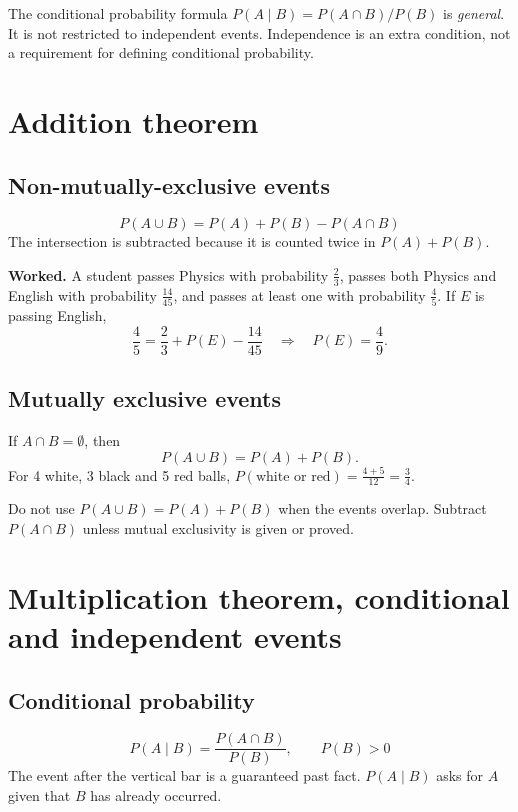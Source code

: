 \documentclass[11pt,a4paper]{article}
\begin{document}
\begin{dangerbox}
The conditional probability formula $P(A\mid B)=P(A\cap B)/P(B)$ is \emph{general}. It is not restricted to independent events. Independence is an extra condition, not a requirement for defining conditional probability.
\end{dangerbox}

\section{Addition theorem}

\subsection{Non-mutually-exclusive events}
\[
\boxed{P(A\cup B)=P(A)+P(B)-P(A\cap B)}
\]
The intersection is subtracted because it is counted twice in $P(A)+P(B)$.

\begin{exambox}
\textbf{Worked.} A student passes Physics with probability $\frac{2}{3}$, passes both Physics and English with probability $\frac{14}{45}$, and passes at least one with probability $\frac{4}{5}$. If $E$ is passing English,
\[
\frac45=\frac23+P(E)-\frac{14}{45}\quad\Longrightarrow\quad P(E)=\frac49.
\]
\end{exambox}

\subsection{Mutually exclusive events}
If $A\cap B=\emptyset$, then
\[
P(A\cup B)=P(A)+P(B).
\]
For 4 white, 3 black and 5 red balls, $P(\text{white or red})=\frac{4+5}{12}=\frac34$.

\begin{dangerbox}
Do not use $P(A\cup B)=P(A)+P(B)$ when the events overlap. Subtract $P(A\cap B)$ unless mutual exclusivity is given or proved.
\end{dangerbox}

\section{Multiplication theorem, conditional and independent events}

\subsection{Conditional probability}
\[
\boxed{P(A\mid B)=\frac{P(A\cap B)}{P(B)},\qquad P(B)>0}
\]
The event after the vertical bar is a guaranteed past fact. $P(A\mid B)$ asks for $A$ given that $B$ has already occurred.
\end{document}
